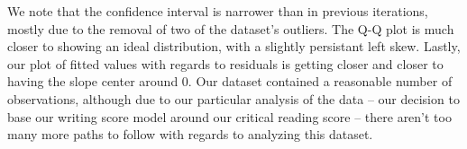 \documentclass[11pt]{article} %
\begin{document}

We note that the confidence interval is narrower than in previous iterations, mostly due to the removal of two of the dataset's outliers. The Q-Q plot is much closer to showing an ideal distribution, with a slightly persistant left skew. Lastly, our plot  of fitted values with regards to residuals is getting closer and closer to having the slope center around 0. Our dataset contained a reasonable number of observations, although due to our particular analysis of the data -- our decision to base our writing score model around our critical reading score -- there aren't too many more paths to follow with regards to analyzing this dataset. 
\end{document}
